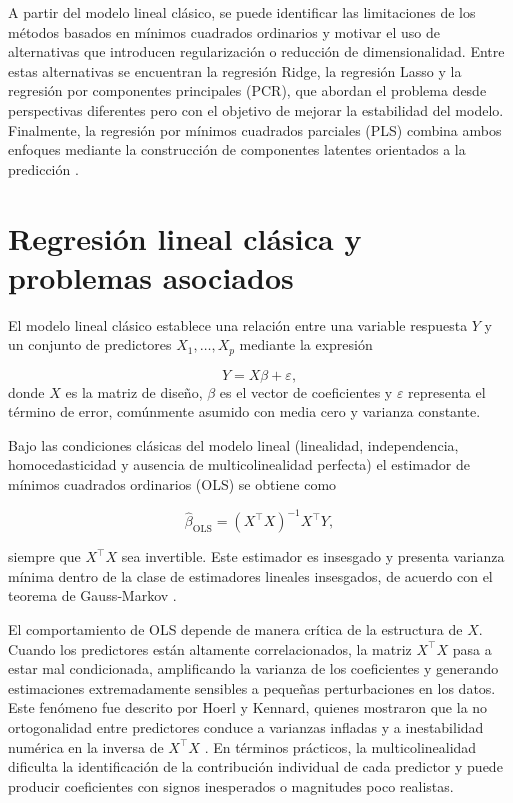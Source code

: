 \documentclass[12pt,a4paper]{report}
\begin{document}
A partir del modelo lineal clásico, se puede identificar las limitaciones de los métodos basados en mínimos cuadrados ordinarios y motivar el uso de alternativas que introducen regularización o reducción de dimensionalidad. Entre estas alternativas se encuentran la regresión Ridge, la regresión Lasso y la regresión por componentes principales (PCR), que abordan el problema desde perspectivas diferentes pero con el objetivo de mejorar la estabilidad del modelo. Finalmente, la regresión por mínimos cuadrados parciales (PLS) combina ambos enfoques mediante la construcción de componentes latentes orientados a la predicción \cite{geladi1986,abdi2010}.

\section{Regresión lineal clásica y problemas asociados} \label{sec:reglinclasica}

El modelo lineal clásico establece una relación entre una variable respuesta \(Y\) y un conjunto de predictores \(X_1,\ldots,X_p\) mediante la expresión

\[
Y = X\beta + \varepsilon,
\]
donde \(X\) es la matriz de diseño, \(\beta\) es el vector de coeficientes y \(\varepsilon\) representa el término de error, comúnmente asumido con media cero y varianza constante.

Bajo las condiciones clásicas del modelo lineal (linealidad, independencia, homocedasticidad y ausencia de multicolinealidad perfecta) el estimador de mínimos cuadrados ordinarios (OLS) se obtiene como

\[
\hat{\beta}_{\text{OLS}} = (X^\top X)^{-1} X^\top Y,
\]

siempre que \(X^\top X\) sea invertible. Este estimador es insesgado y presenta varianza mínima dentro de la clase de estimadores lineales insesgados, de acuerdo con el teorema de Gauss‑Markov \cite{hastie2009}.

El comportamiento de OLS depende de manera crítica de la estructura de \(X\). Cuando los predictores están altamente correlacionados, la matriz \(X^\top X\) pasa a estar mal condicionada, amplificando la varianza de los coeficientes y generando estimaciones extremadamente sensibles a pequeñas perturbaciones en los datos. Este fenómeno fue descrito por Hoerl y Kennard, quienes mostraron que la no ortogonalidad entre predictores conduce a varianzas infladas y a inestabilidad numérica en la inversa de \(X^\top X\) \cite{hoerl1970}.  En términos prácticos, la multicolinealidad dificulta la identificación de la contribución individual de cada predictor y puede producir coeficientes con signos inesperados o magnitudes poco realistas.
\end{document}
